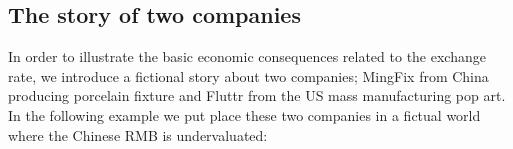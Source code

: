 \documentclass[11pt]{article}
\begin{document}





 



\subsection{The story of two companies}

In order to illustrate the basic economic consequences related to the 
exchange rate, we introduce a fictional story about two companies; 
MingFix from China producing porcelain fixture and Fluttr from the US 
mass manufacturing pop art. In the following example we put place these 
two companies in a fictual world where the Chinese RMB is undervaluated:
\end{document}
